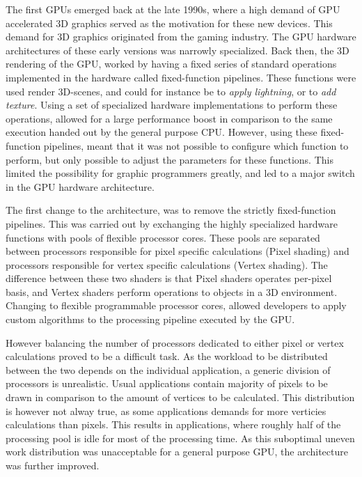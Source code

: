 The first GPUs  emerged back at the late 1990s, where a high demand of GPU accelerated 3D graphics served as the motivation for these new devices.
This demand for 3D graphics originated from the gaming industry.
The GPU hardware architectures of these early versions was narrowly specialized.
Back then, the 3D rendering of the GPU, worked by having a fixed series of standard operations implemented in the hardware called fixed-function pipelines.
These functions were used render 3D-scenes, and could for instance be to \textit{apply lightning}, or to \textit{add texture}.
Using a set of specialized hardware implementations to perform these operations, allowed for a large performance boost in comparison to the same execution handed out by the general purpose CPU.
However, using these fixed-function pipelines, meant that it was not possible to configure which function to perform, but only possible to adjust the parameters for these functions.
This limited the possibility for graphic programmers greatly, and led to a major switch in the GPU hardware architecture.

The first change to the architecture, was to remove the strictly fixed-function pipelines.
This was carried out by exchanging the highly specialized hardware functions with pools of flexible processor cores.
These pools are separated between processors responsible for pixel specific calculations (Pixel shading) and processors responsible for vertex specific calculations (Vertex shading).
The difference between these two shaders is that Pixel shaders operates per-pixel basis, and Vertex shaders perform operations to objects in a 3D environment.
Changing to flexible programmable processor cores, allowed developers to apply custom algorithms to the processing pipeline executed by the GPU.


However balancing the number of processors dedicated to either pixel or vertex calculations proved to be a difficult task.
As the workload to be distributed between the two depends on the individual application, a generic division of processors is unrealistic.
Usual applications contain majority of pixels to be drawn in comparison to the amount of vertices to be calculated.
This distribution is however not alway true, as some applications demands for more verticies calculations than pixels.
This results in applications, where roughly half of the processing pool is idle for most of the processing time.
As this suboptimal uneven work distribution was unacceptable for a general purpose GPU, the architecture was further improved.

